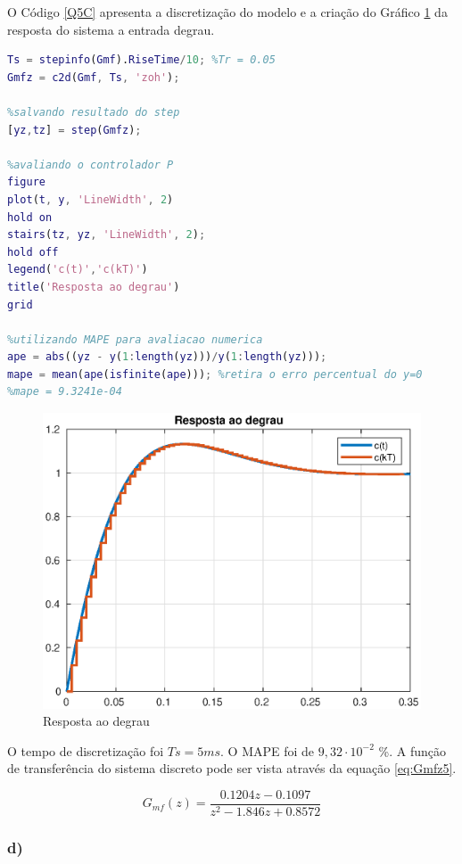 O Código \ref{Q5C} apresenta a discretização do modelo e a criação do Gráfico \ref{fig:Stepctds5} da resposta do sistema a entrada degrau.

\begin{lstlisting}[language=Matlab,label=Q5C,caption=Análise da estabilidade]
% c)
Ts = stepinfo(Gmf).RiseTime/10; %Tr = 0.05
Gmfz = c2d(Gmf, Ts, 'zoh');

%salvando resultado do step
[yz,tz] = step(Gmfz); 

%avaliando o controlador P
figure 
plot(t, y, 'LineWidth', 2)
hold on
stairs(tz, yz, 'LineWidth', 2);
hold off
legend('c(t)','c(kT)')
title('Resposta ao degrau')
grid

%utilizando MAPE para avaliacao numerica
ape = abs((yz - y(1:length(yz)))/y(1:length(yz))); 
mape = mean(ape(isfinite(ape))); %retira o erro percentual do y=0
%mape = 9.3241e-04
\end{lstlisting}


\begin{figure}[!ht]
    \centering
    \includegraphics[width = 0.75\linewidth]{Figuras/ProblemasPI/Problema5/stepz.eps}
    \caption{Resposta ao degrau}
    \label{fig:Stepctds5}                   
\end{figure}

O tempo de discretização foi $Ts = 5ms$. O MAPE foi de $9,32 \cdot 10^{-2}$ \%. A função de transferência do sistema discreto pode ser vista através
da equação \ref{eq:Gmfz5}. 

\begin{equation}
    G_{mf}(z) = \frac{ 0.1204 z - 0.1097}{ z^2 - 1.846 z + 0.8572}
    \label{eq:Gmfz5}
\end{equation}


\newpage
\subsubsection*{d)}

